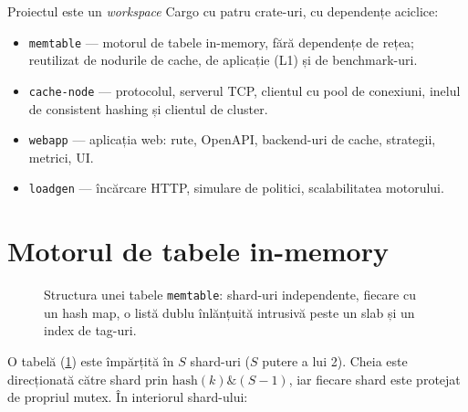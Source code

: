 Proiectul este un \emph{workspace} Cargo cu patru crate-uri, cu dependențe aciclice:

\begin{center}
\end{center}

\begin{itemize}
  \item \texttt{memtable} — motorul de tabele in-memory, fără dependențe de rețea; reutilizat de nodurile
        de cache, de aplicație (L1) și de benchmark-uri.
  \item \texttt{cache-node} — protocolul, serverul TCP, clientul cu pool de conexiuni, inelul de
        consistent hashing și clientul de cluster.
  \item \texttt{webapp} — aplicația web: rute, OpenAPI, backend-uri de cache, strategii, metrici, UI.
  \item \texttt{loadgen} — încărcare HTTP, simulare de politici, scalabilitatea motorului.
\end{itemize}

\section{Motorul de tabele in-memory}

\begin{figure}[H]
  \centering
  \resizebox{0.92\linewidth}{!}{}
  \caption{Structura unei tabele \texttt{memtable}: shard-uri independente, fiecare cu un hash map,
           o listă dublu înlănțuită intrusivă peste un slab și un index de tag-uri.}
  \label{fig:memtable}
\end{figure}

O tabelă (\cref{fig:memtable}) este împărțită în $S$ shard-uri ($S$ putere a lui 2). Cheia este
direcționată către shard prin $\text{hash}(k) \mathbin{\&} (S-1)$, iar fiecare shard este protejat de
propriul mutex. În interiorul shard-ului:

